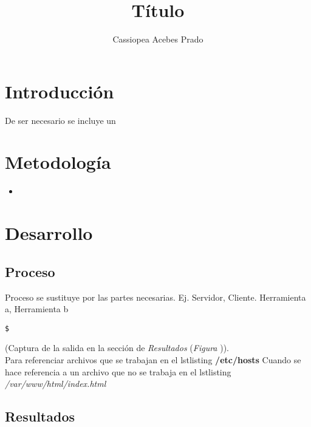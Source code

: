 \documentclass[12pt,twocolumn]{article}
\begin{document}
\onecolumn
\title{\Huge \bf Título}

\author{Cassiopea Acebes Prado}

\maketitle


\tableofcontents

\newpage
\twocolumn
\section{Introducción}

De ser necesario se incluye un %

\section{Metodología}



\begin{itemize}
\setlength\itemsep{-0.3em}
\item 
\end{itemize}

	
\section{Desarrollo}
	\subsection{Proceso}
	
Proceso se sustituye por las partes necesarias. Ej. Servidor, Cliente. Herramienta a, Herramienta b

\begin{lstlisting}[texcl=true]
$ 
\end{lstlisting}
(Captura de la salida en la sección de \textit{Resultados} (\textit{Figura })).\\

Para referenciar archivos que se trabajan en el lstlisting \textbf{/etc/hosts}
Cuando se hace referencia a un archivo que no se trabaja en el lstlisting \textit{/var/www/html/index.html}

\onecolumn
\subsection{Resultados}
%
\end{document}
